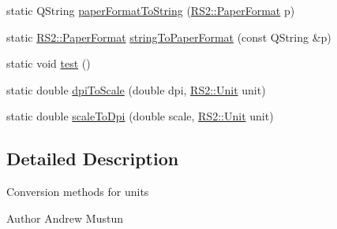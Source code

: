 \begin{DoxyCompactItemize}
\item 
static Q\-String \hyperlink{classRS__Units_a978ff55136f2e14415e0c52866d92514}{paper\-Format\-To\-String} (\hyperlink{classRS2_a99636ecac997160f1e2982859a043cb4}{R\-S2\-::\-Paper\-Format} p)
\item 
static \hyperlink{classRS2_a99636ecac997160f1e2982859a043cb4}{R\-S2\-::\-Paper\-Format} \hyperlink{classRS__Units_a3ad1f793852a5a2dd529444236d6095c}{string\-To\-Paper\-Format} (const Q\-String \&p)
\item 
static void \hyperlink{classRS__Units_a0a5f6c84f48353bfed10fa8f2b7582e6}{test} ()
\item 
static double \hyperlink{classRS__Units_aec32a21b1b04d2e25f0820ca712c02f3}{dpi\-To\-Scale} (double dpi, \hyperlink{classRS2_ad859751df6978737e4f35ec111ff9828}{R\-S2\-::\-Unit} unit)
\item 
static double \hyperlink{classRS__Units_ad83f1cf0fb0e2c2a5a208d91909b3ea7}{scale\-To\-Dpi} (double scale, \hyperlink{classRS2_ad859751df6978737e4f35ec111ff9828}{R\-S2\-::\-Unit} unit)
\end{DoxyCompactItemize}


\subsection{Detailed Description}
Conversion methods for units

\begin{DoxyAuthor}{Author}
Andrew Mustun 
\end{DoxyAuthor}


